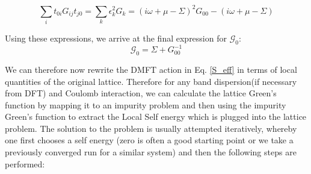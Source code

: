 \documentclass[10pt]{ruthesis}
\begin{document}
  \begin{equation}
  \sum_{i} t_{0i} G_{ij} t_{j0} = \sum_{k}\epsilon^2_k G_k= (i\omega +\mu -\Sigma)^2G_{00} -(i\omega +\mu -\Sigma)
  \end{equation} 
  
  Using these expressions, we arrive at the final expression for $\mathcal{G}_0$:
  \begin{equation}
  \mathcal{G}_0=\Sigma + G_{00}^{-1}
  \end{equation}
  
 We can therefore now rewrite the DMFT action in Eq. \ref{S_eff} in terms of local quantities of the original lattice. Therefore for any band dispersion(if necessary from DFT) and Coulomb interaction, we can calculate the lattice Green's function by mapping it to an impurity problem and then using the impurity Green's function to extract the Local Self energy which is plugged into the lattice problem. 
The solution to the problem is usually attempted iteratively, whereby one first chooses a self energy (zero is often a good starting point or we take a previously converged run for a similar system) and then the following steps are performed:
\end{document}
